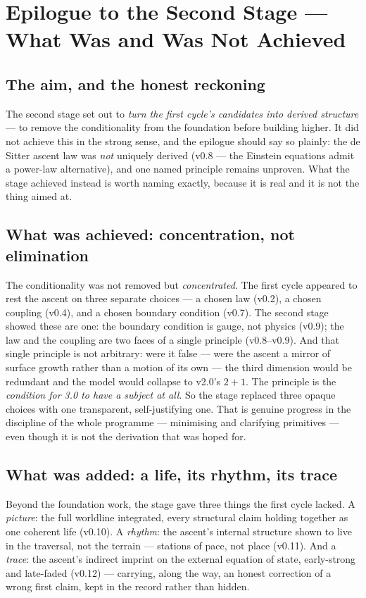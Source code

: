 \documentclass[11pt,a4paper]{article}
\theoremstyle{plain}
\theoremstyle{definition}
\theoremstyle{remark}
\begin{document}
\section*{Epilogue to the Second Stage --- What Was and Was Not Achieved}

\subsection*{The aim, and the honest reckoning}
The second stage set out to \emph{turn the first cycle's candidates into derived structure} --- to
remove the conditionality from the foundation before building higher. It did not achieve this in the
strong sense, and the epilogue should say so plainly: the de Sitter ascent law was \emph{not} uniquely
derived (v0.8 --- the Einstein equations admit a power-law alternative), and one named principle
remains unproven. What the stage achieved instead is worth naming exactly, because it is real and it is
not the thing aimed at.

\subsection*{What was achieved: concentration, not elimination}
The conditionality was not removed but \emph{concentrated}. The first cycle appeared to rest the ascent
on three separate choices --- a chosen law (v0.2), a chosen coupling (v0.4), and a chosen boundary
condition (v0.7). The second stage showed these are one: the boundary condition is gauge, not physics
(v0.9); the law and the coupling are two faces of a single principle (v0.8--v0.9). And that single
principle is not arbitrary: were it false --- were the ascent a mirror of surface growth rather than a
motion of its own --- the third dimension would be redundant and the model would collapse to v2.0's
$2{+}1$. The principle is the \emph{condition for 3.0 to have a subject at all}. So the stage replaced
three opaque choices with one transparent, self-justifying one. That is genuine progress in the
discipline of the whole programme --- minimising and clarifying primitives --- even though it is not
the derivation that was hoped for.

\subsection*{What was added: a life, its rhythm, its trace}
Beyond the foundation work, the stage gave three things the first cycle lacked. A \emph{picture}: the
full worldline integrated, every structural claim holding together as one coherent life (v0.10). A
\emph{rhythm}: the ascent's internal structure shown to live in the traversal, not the terrain ---
stations of pace, not place (v0.11). And a \emph{trace}: the ascent's indirect imprint on the external
equation of state, early-strong and late-faded (v0.12) --- carrying, along the way, an honest
correction of a wrong first claim, kept in the record rather than hidden.
\end{document}
